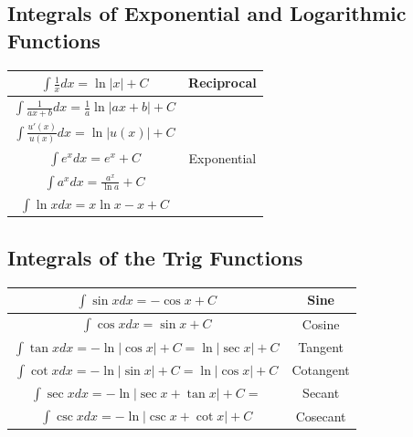     \subsection{Integrals of Exponential and Logarithmic Functions}
        \begin{center}
            \begin{tabular} {|c|c|}
                \hline
                $\int \frac{1}{x} dx = \ln{|x|}+C$ & Reciprocal \\
                \hline
                $\int \frac{1}{ax+b}dx = \frac{1}{a}\ln{|ax+b|}+C$ & \\
                \hline
                $\int \frac{u'(x)}{u(x)}dx = \ln{|u(x)|+C}$ & \\
                \hline
                $\int e^x dx = e^x+C$ & Exponential \\
                \hline
                $\int a^x dx = \frac{a^x}{\ln{a}}+C$ & \\
                \hline
                $\int \ln{x} dx = x\ln{x}-x + C$ & \\
                \hline
            \end{tabular}
        \end{center}

    \pagebreak
    \subsection{Integrals of the Trig Functions}
        \begin{center}
            \begin{tabular} {|c|c|}
                \hline
                $\int \sin{x} dx = -\cos{x}+C$ & Sine \\
                \hline
                $\int \cos{x} dx = \sin{x}+C$ & Cosine \\
                \hline
                $\int \tan{x} dx = -\ln{|\cos{x}|}+C=\ln{|\sec{x}|}+C$ & Tangent \\
                \hline
                $\int \cot{x} dx = -\ln{|\sin{x}|}+C = \ln{|\cos{x}|}+C$ & Cotangent \\
                \hline
                $\int \sec{x} dx = -\ln{|\sec{x}+\tan{x}|}+C=$ & Secant \\
                \hline
                $\int \csc{x} dx = -\ln{|\csc{x}+\cot{x}|}+C$ & Cosecant \\
                \hline
            \end{tabular}
        \end{center}

